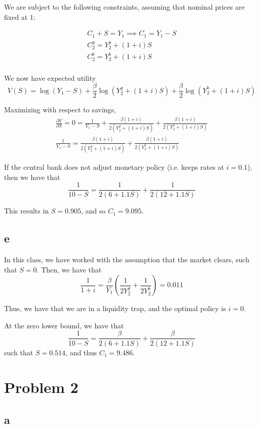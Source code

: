 \documentclass[12pt,letterpaper]{article}
\theoremstyle{definition}
\begin{document}
We are subject to the following constraints, assuming that nominal prices are
fixed at $1$:

\begin{gather*}
  C_1 + S = Y_1 \implies C_1 = Y_1 - S\\
  C_2^g = Y_2^g + (1 + i)S \\
  C_2^b = Y_2^b + (1 + i)S \\
\end{gather*}

We now have expected utility
\[
  V(S) = \log(Y_1 - S) + \frac{\beta}{2}\log(Y_2^g + (1 + i)S) + \frac{\beta}{2}\log(Y_2^b + (1 + i)S)
\]

Maximizing with respect to savings,
\begin{gather*}
  \frac{\partial V}{\partial S} = 0 = \frac{1}{Y_1 - S} + \frac{\beta(1+i)}{2(Y_2^g
    + (1+i)S)} + \frac{\beta(1+i)}{2(Y_2^b + (1+i)S)} \\
  \frac{1}{Y_1 - S} = \frac{\beta(1+i)}{2(Y_2^g
    + (1+i)S)} + \frac{\beta(1+i)}{2(Y_2^b + (1+i)S)}
\end{gather*}

If the central bank does not adjust monetary policy (i.e. keeps rates at $i =
0.1$), then we have that
\[
  \frac{1}{10 - S} = \frac{1}{2(6 + 1.1S)} + \frac{1}{2(12 + 1.1S)}
\]

This results in $S = 0.905$, and so $C_1 = 9.095$.

\subsection*{e}

In this class, we have worked with the assumption that the market clears, such
that $S = 0$. Then, we have that
\[
  \frac{1}{1+i} = \frac{\beta}{Y_1}(\frac{1}{2Y_2^g} + \frac{1}{2Y_2^b}) = 0.011
\]

Thus, we have that we are in a liquidity trap, and the optimal policy is $i = 0$.

At the zero lower bound, we have that
\[
  \frac{1}{10 - S} = \frac{\beta}{2(6 + 1.1S)} + \frac{\beta}{2(12 + 1.1S)}
\]
such that $S = 0.514$, and thus $C_1 = 9.486$.
\section*{Problem 2}

\subsection*{a}
\end{document}
